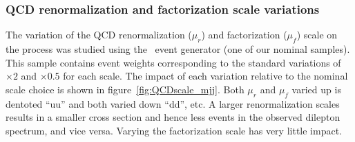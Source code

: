 \subsubsection{QCD renormalization and factorization scale variations}
The variation of the QCD renormalization ($\mu_r$) and factorization ($\mu_f$) scale on the process was studied using the \sherpa\ event generator (one of our nominal samples).
This sample contains event weights corresponding to the standard variations of $\times 2$ and $\times 0.5$ for each scale.
The impact of each variation relative to the nominal scale choice is shown in figure~\ref{fig:QCDscale_mjj}.
Both $\mu_r$ and $\mu_f$ varied up is dentoted ``uu'' and both varied down ``dd'', etc.
A larger renormalization scales results in a smaller cross section and hence less events in the observed dilepton \pt spectrum, and vice versa.
Varying the factorization scale has very little impact.


